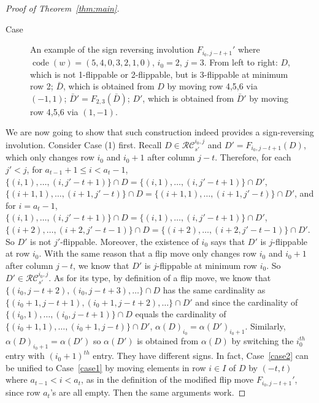 \documentclass[10pt]{amsart}
\newcommand{\RC}{\mathcal{RC}}
\DeclareMathOperator{\code}{code}
\begin{document}
\begin{proof}[Proof of Theorem~\ref{thm:main}]
\begin{enonce}[remark]{Case}
\begin{figure}[h!]
\caption{An example of the sign reversing involution $F_{i_0,j-t+1}'$ where $\code(w)=(5,4,0,3,2,1,0)$, $i_0=2$, $j=3$. From left to right: $D$, which is not 1-flippable or 2-flippable, but is 3-flippable at minimum row 2; $\bar D$, which is obtained from $D$ by moving row 4,5,6 via $(-1,1)$; $\bar D'=F_{2,3}(\bar D)$; $D'$, which is obtained from $\bar D'$ by moving row 4,5,6 via $(1,-1)$.}
\label{fig:flipmodi}
\end{figure}
\end{enonce}
\let\thecdrthm\oldthecdrthm
\setcounter{cdrthm}{2}

We are now going to show that such construction indeed provides a sign-reversing involution. Consider Case (1) first. Recall $D\in\RC_{s'}^{i_0,j}$ and $D'=F_{i_0,j-t+1}(D)$, which only changes row $i_0$ and $i_0+1$ after column $j-t$. Therefore, for each $j'<j$, for $a_{t-1}+1\leq i<a_t-1$, $\{(i,1),\ldots,(i,j'-t+1)\}\cap D=\{(i,1),\ldots,(i,j'-t+1)\}\cap D'$, $\{(i+1,1),\ldots,(i+1,j'-t)\}\cap D=\{(i+1,1),\ldots,(i+1,j'-t)\}\cap D'$, and for $i=a_t-1$, $\{(i,1),\ldots,(i,j'-t+1)\}\cap D=\{(i,1),\ldots,(i,j'-t+1)\}\cap D'$, $\{(i+2),\ldots,(i+2,j'-t-1)\}\cap D=\{(i+2),\ldots,(i+2,j'-t-1)\}\cap D'$. So $D'$ is not $j'$-flippable. Moreover, the existence of $i_0$ says that $D'$ is $j$-flippable at row $i_0$. With the same reason that a flip move only changes row $i_0$ and $i_0+1$ after column $j-t$, we know that $D'$ is $j$-flippable at minimum row $i_0$. So $D'\in\RC_{s'}^{i_0,j}$. As for its type, by definition of a flip move, we know that $\{(i_0,j-t+2),(i_0,j-t+3),\ldots\}\cap D$ has the same cardinality as $\{(i_0+1,j-t+1),(i_0+1,j-t+2),\ldots\}\cap D'$ and since the cardinality of $\{(i_0,1),\ldots,(i_0,j-t+1)\}\cap D$ equals the cardinality of $\{(i_0+1,1),\ldots,(i_0+1,j-t)\}\cap D'$, $\alpha(D)_{i_0}=\alpha(D')_{i_0+1}$. Similarly, $\alpha(D)_{i_0+1}=\alpha(D')$ so $\alpha(D')$ is obtained from $\alpha(D)$ by switching the $i_0^{th}$ entry with $(i_0+1)^{th}$ entry. They have different signs. In fact, Case~\ref{case2} can be unified to Case~\ref{case1} by moving elements in row $i\in I$ of $D$ by $(-t,t)$ where $a_{t-1}<i<a_t$, as in the definition of the modified flip move $F_{i_0,j-t+1}'$, since row $a_t$'s are all empty. Then the same arguments work.


\end{proof}
\end{document}
